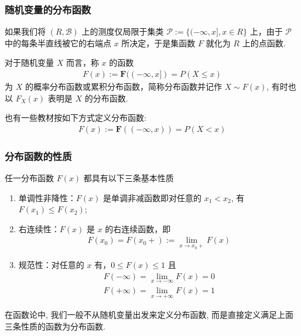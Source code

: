 \begin{frame}
	\frametitle{随机变量的分布函数}
	如果我们将 $(R,\mathcal{B})$ 上的测度仅局限于集类 $\mathcal{P}:=\{(-\infty,x],x\in R\}$ 上，由于 $\mathcal{P}$ 中的每条半直线被它的右端点 $x$ 所决定，于是集函数 $F$ 就化为 $R$ 上的点函数.
	\pause
	\begin{defi}
		对于随机变量 $X$ 而言，称 $x$ 的函数
		\begin{eqnarray*}
			F(x):=\mathbf{F}((-\infty,x])=P(X\le x)
		\end{eqnarray*}
		为 $X$ 的概率分布函数或累积分布函数，简称分布函数并记作 $X\sim F (x)$, 有时也以 $F_X (x)$ 表明是 $X$ 的分布函数.
	\end{defi}
	\pause  \begin{rmk}
		也有一些教材按如下方式定义分布函数:
		\begin{eqnarray*}
			F(x):=\mathbf{F}((-\infty,x))=P(X<x)
		\end{eqnarray*}

	\end{rmk}
\end{frame}

\begin{frame}
	\frametitle{分布函数的性质}
	\begin{thm}
		任一分布函数 $F (x)$ 都具有以下三条基本性质
		\begin{enumerate}[<+-|alert@+>]
			\item 单调性非降性：$F (x)$ 是单调非减函数即对任意的 $x_1<x_2$, 有 $F (x_1)\le F (x_2)$;
			\item 右连续性：$F (x)$ 是 $x$ 的右连续函数，即
			      \begin{eqnarray*}
				      F(x_0)=F(x_0+):=\lim_{x\rightarrow x_0+}F(x)
			      \end{eqnarray*}

			\item 规范性：对任意的 $x$ 有，$0\le F (x)\le 1$ 且
			      \begin{eqnarray*}
				      F(-\infty)=\lim_{x\rightarrow-\infty}F(x)=0\\
				      F(+\infty)=\lim_{x\rightarrow +\infty}F(x)=1
			      \end{eqnarray*}
		\end{enumerate}

	\end{thm}
	\pause%
	\begin{rmk}
	在函数论中, 我们一般不从随机变量出发来定义分布函数, 而是直接定义满足上面三条性质的函数为分布函数.
	\end{rmk}

\end{frame}

